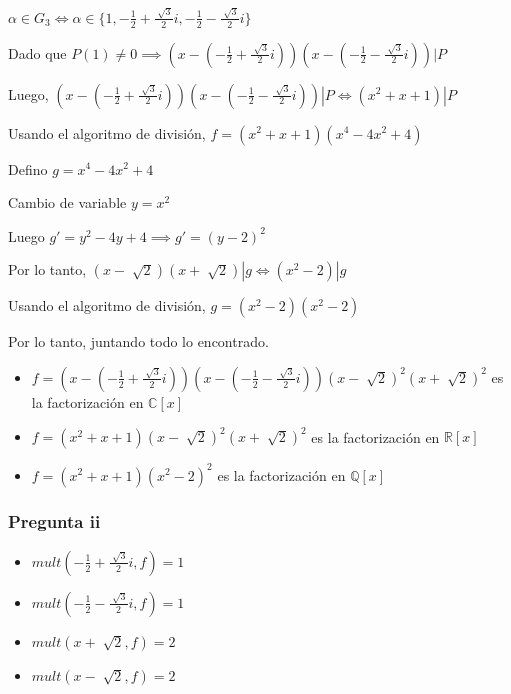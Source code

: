 $ \alpha \in G_3 \iff \alpha \in \{ 1, -\frac{1}{2} + \frac{\sqrt[]{3}}{2}i, -\frac{1}{2} - \frac{\sqrt[]{3}}{2}i \} $

Dado que $ P(1) \neq 0 \implies (x-(-\frac{1}{2} + \frac{\sqrt[]{3}}{2}i))(x-(-\frac{1}{2} - \frac{\sqrt[]{3}}{2}i))|P $

Luego, $ (x-(-\frac{1}{2} + \frac{\sqrt[]{3}}{2}i))(x-(-\frac{1}{2} - \frac{\sqrt[]{3}}{2}i))|P \iff (x^2 + x +1) |P $

Usando el algoritmo de división, $ f = (x^2 + x +1)(x^4 - 4x^2 + 4) $

Defino $ g = x^4 - 4x^2 + 4 $

Cambio de variable $ y = x^2 $

Luego $ g' = y^2 - 4y + 4 \implies g' = (y-2)^2$ 

Por lo tanto, $ (x-\sqrt[]{2})(x+\sqrt[]{2}) | g \iff (x^2 - 2) | g $

Usando el algoritmo de división, $ g = (x^2 - 2)(x^2 - 2) $

Por lo tanto, juntando todo lo encontrado.

\begin{itemize}
    \item $ f = (x-(-\frac{1}{2} + \frac{\sqrt[]{3}}{2}i))(x-(-\frac{1}{2} - \frac{\sqrt[]{3}}{2}i))(x-\sqrt[]{2})^2(x+\sqrt[]{2})^2 $ es la factorización en $ \mathbb{C}[x] $
    \item $ f = (x^2 + x +1)(x-\sqrt[]{2})^2(x+\sqrt[]{2})^2 $ es la factorización en $ \mathbb{R}[x] $
    \item $ f = (x^2 + x +1)(x^2 - 2)^2 $ es la factorización en $ \mathbb{Q}[x] $
\end{itemize}

\subsubsection{Pregunta ii}
\begin{itemize}
    \item $ mult(-\frac{1}{2} + \frac{\sqrt[]{3}}{2}i, f) = 1 $
    \item $ mult(-\frac{1}{2} - \frac{\sqrt[]{3}}{2}i, f) = 1 $
    \item $ mult(x+\sqrt[]{2}, f) = 2 $
    \item $ mult(x-\sqrt[]{2}, f) = 2 $
\end{itemize}


